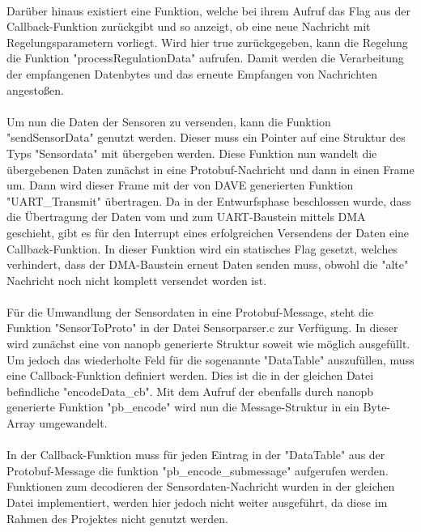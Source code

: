 \paragraph{}
Darüber hinaus existiert eine Funktion, welche bei ihrem Aufruf das Flag aus der Callback-Funktion zurückgibt und so anzeigt, ob eine neue Nachricht mit Regelungsparametern vorliegt. Wird hier true zurückgegeben, kann die Regelung die Funktion "processRegulationData" aufrufen. Damit werden die Verarbeitung der empfangenen Datenbytes und das erneute Empfangen von Nachrichten angestoßen.
\paragraph{}
Um nun die Daten der Sensoren zu versenden, kann die Funktion "sendSensorData" genutzt werden. Dieser muss ein Pointer auf eine Struktur des Typs "Sensordata" mit übergeben werden. Diese Funktion nun wandelt die übergebenen Daten zunächst in eine Protobuf-Nachricht und dann in einen Frame um. Dann wird dieser Frame mit der von DAVE generierten Funktion "UART\_Transmit" übertragen. Da in der Entwurfsphase beschlossen wurde, dass die Übertragung der Daten vom und zum UART-Baustein mittels DMA geschieht, gibt es für den Interrupt eines erfolgreichen Versendens der Daten eine Callback-Funktion. In dieser Funktion wird ein statisches Flag gesetzt, welches verhindert, dass der DMA-Baustein erneut Daten senden muss, obwohl die "alte" Nachricht noch nicht komplett versendet worden ist.
\paragraph{}
Für die Umwandlung der Sensordaten in eine Protobuf-Message, steht die Funktion "SensorToProto" in der Datei Sensorparser.c zur Verfügung. In dieser wird zunächst eine von nanopb generierte Struktur soweit wie möglich ausgefüllt. Um jedoch das wiederholte Feld für die sogenannte "DataTable" auszufüllen, muss eine Callback-Funktion definiert werden. Dies ist die in der gleichen Datei befindliche "encodeData\_cb". Mit dem Aufruf der ebenfalls durch nanopb generierte Funktion "pb\_encode" wird nun die Message-Struktur in ein Byte-Array umgewandelt.
\paragraph{}
In der Callback-Funktion muss für jeden Eintrag in der "DataTable" aus der Protobuf-Message die funktion "pb\_encode\_submessage" aufgerufen werden. Funktionen zum decodieren der Sensordaten-Nachricht wurden in der gleichen Datei implementiert, werden hier jedoch nicht weiter ausgeführt, da diese im Rahmen des Projektes nicht genutzt werden.

